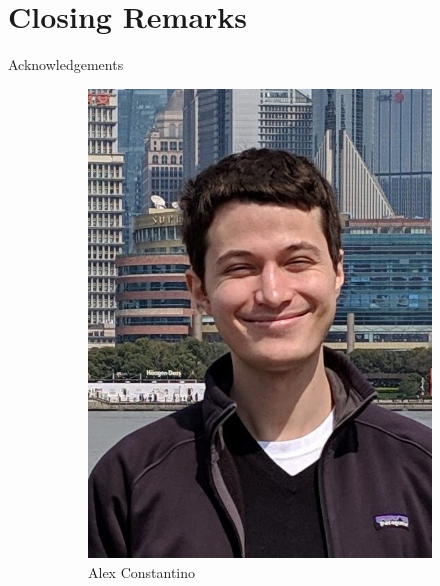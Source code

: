 \section{Closing Remarks}
\frame{\tableofcontents[currentsection]}

\begin{frame}{Acknowledgements}
\begin{figure}
    \centering
    \begin{subfigure}[b]{0.3\textwidth}
        \centering
        \includegraphics[width=\textwidth]{figures/alex-constantino.jpeg}
        \caption{Alex Constantino}
    \end{subfigure}
    \hfill
    \begin{subfigure}[b]{0.3\textwidth}
        \centering

\end{subfigure}
\end{figure}
\end{frame}
